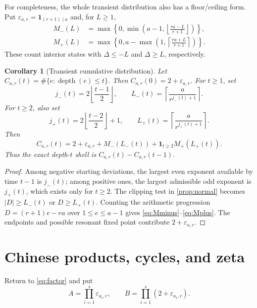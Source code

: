 \documentclass[11pt,a4paper]{amsart}
\newcommand{\depth}{\operatorname{depth}}
\newtheorem{corollary}[theorem]{Corollary}
\begin{document}
For completeness, the whole transient distribution also has a floor/ceiling
form.  Put $\varepsilon_{a,r}=\mathbf1_{(r+1)\mid a}$ and, for $L\geq1$,
\begin{align}
 M_-(L)&=\max\left\{0,
  \min\left(a-1,\left\lfloor\frac{ra-L}{r+1}\right\rfloor\right)\right\},
 \label{eq:Mminus}\\
 M_+(L)&=\max\left\{0,
  a-\max\left(1,\left\lceil\frac{ra+L}{r+1}\right\rceil\right)\right\}.
 \label{eq:Mplus}
\end{align}
These count interior states with $\Delta\leq-L$ and $\Delta\geq L$,
respectively.

\begin{corollary}[Transient cumulative distribution]
\label{cor:cdf}
Let $C_{a,r}(t)=\#\{e:\depth(e)\leq t\}$.  Then
$C_{a,r}(0)=2+\varepsilon_{a,r}$.  For $t\geq1$, set
\[
 j_-(t)=2\left\lfloor\frac{t-1}{2}\right\rfloor,
 \qquad L_-(t)=\left\lceil\frac{a}{r^{j_-(t)+1}}\right\rceil.
\]
For $t\geq2$, also set
\[
 j_+(t)=2\left\lfloor\frac{t-2}{2}\right\rfloor+1,
 \qquad L_+(t)=\left\lceil\frac{a}{r^{j_+(t)+1}}\right\rceil.
\]
Then
\begin{equation}
 \label{eq:cdf}
 C_{a,r}(t)=2+\varepsilon_{a,r}+M_-(L_-(t))
 +\mathbf1_{t\geq2}M_+(L_+(t)).
\end{equation}
Thus the exact depth-$t$ shell is $C_{a,r}(t)-C_{a,r}(t-1)$.
\end{corollary}

\begin{proof}
Among negative starting deviations, the largest even exponent available by
time $t-1$ is $j_-(t)$; among positive ones, the largest admissible odd
exponent is $j_+(t)$, which exists only for $t\geq2$.  The clipping test in
\cref{prop:normal} becomes $|D|\geq L_-(t)$ or $D\geq L_+(t)$.  Counting the
arithmetic progression $D=(r+1)e-ra$ over $1\leq e\leq a-1$ gives
\eqref{eq:Mminus}--\eqref{eq:Mplus}.  The endpoints and possible resonant
fixed point contribute $2+\varepsilon_{a,r}$.
\end{proof}

\section{Chinese products, cycles, and zeta}

Return to \eqref{eq:factor} and put
\begin{equation}
 \label{eq:AB}
 A=\prod_{i=1}^{s}\varepsilon_{a_i,r},
 \qquad B=\prod_{i=1}^{s}(2+\varepsilon_{a_i,r}).
\end{equation}
\end{document}
